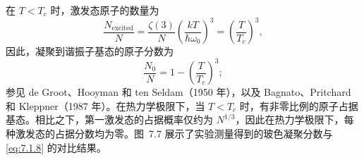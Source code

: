 在 \(T < T_{c}\) 时，激发态原子的数量为
\begin{equation}\tag{7.1.58}\label{eq:7.1.58}
\frac { N _ { \mathrm { e x c i t e d } } } { N } = \frac { \zeta ( 3 ) } { N } \left( \frac { k T } { \hbar \omega _ { 0 } } \right) ^{3} = \left( \frac { T } { T _ { c } } \right) ^{3} ,
\end{equation}
因此，凝聚到谐振子基态的原子分数为
\begin{equation}\tag{7.1.59}\label{eq:7.1.59}
\frac { N _ { 0 } } { N } = 1 - \left( \frac { T } { T _ { c } } \right) ^{3} ;
\end{equation}
参见 de Groot、Hooyman 和 ten Seldam（1950 年），以及 Bagnato、Pritchard 和 Kleppner（1987 年）。在热力学极限下，当 \(T < T_{c}\) 时，有非零比例的原子占据基态。相比之下，第一激发态的占据概率仅约为 \(N^{1/3}\)，因此在热力学极限下，每种激发态的占据分数均为零。图~7.7 展示了实验测量得到的玻色凝聚分数与\autoref{eq:7.1.8} 的对比结果。
